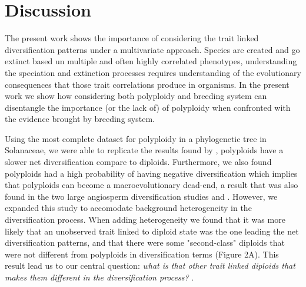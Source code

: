 \section{Discussion}

The present work shows the importance of considering the trait linked diversification patterns under a multivariate approach. Species are created and go extinct based un multiple and often highly correlated phenotypes, understanding the speciation and extinction processes requires understanding of the evolutionary consequences that those trait correlations produce in organisms. In the present work we show how considering both polyploidy and breeding system can disentangle the importance (or the lack of) of polyploidy when confronted with the evidence brought by breeding system.\newline

Using the most complete dataset for polyploidy in a phylogenetic tree in Solanaceae, we were able to replicate the results found by \citet{mayrose_2011}, polyploids have a slower net diversification compare to diploids. Furthermore,  we also found polyploids had a high probability of having negative diversification which implies that polyploids can become a macroevolutionary dead-end, a result that was also found in the two large angiosperm diversification studies  \citet{mayrose_2011} and \citet{mayrose_2015}. However, we expanded this study to accomodate  background heterogeneity in the diversification process. When adding heterogeneity we found that it was more likely that an unobserved trait linked to diploid state was the one leading the net diversification patterns, and that there were some "second-class"  diploids that were not different from  polyploids  in diversification terms (Figure 2A). This result lead us to our central question: \textit{what is that other trait linked diploids that makes them different in the diversification process? }.\newline

